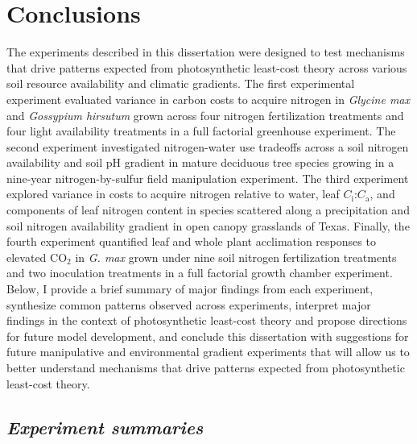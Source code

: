 \chapter{\textbf{Conclusions}}
\noindent The experiments described in this dissertation were designed to test mechanisms that drive patterns expected from photosynthetic least-cost theory across various soil resource availability and climatic gradients. The first experimental experiment evaluated variance in carbon costs to acquire nitrogen in \textit{Glycine max} and \textit{Gossypium hirsutum} grown across four nitrogen fertilization treatments and four light availability treatments in a full factorial greenhouse experiment. The second experiment investigated nitrogen-water use tradeoffs across a soil nitrogen availability and soil pH gradient in mature deciduous tree species growing in a nine-year nitrogen-by-sulfur field manipulation experiment. The third experiment explored variance in costs to acquire nitrogen relative to water, leaf $C_\mathrm{i}$:$C_\mathrm{a}$, and components of leaf nitrogen content in species scattered along a precipitation and soil nitrogen availability gradient in open canopy grasslands of Texas. Finally, the fourth experiment quantified leaf and whole plant acclimation responses to elevated CO$_2$ in \textit{G. max} grown under nine soil nitrogen fertilization treatments and two inoculation treatments in a full factorial growth chamber experiment. Below, I provide a brief summary of major findings from each experiment, synthesize common patterns observed across experiments, interpret major findings in the context of photosynthetic least-cost theory and propose directions for future model development, and conclude this dissertation with suggestions for future manipulative and environmental gradient experiments that will allow us to better understand mechanisms that drive patterns expected from photosynthetic least-cost theory.

\section{\textit{Experiment summaries}}
